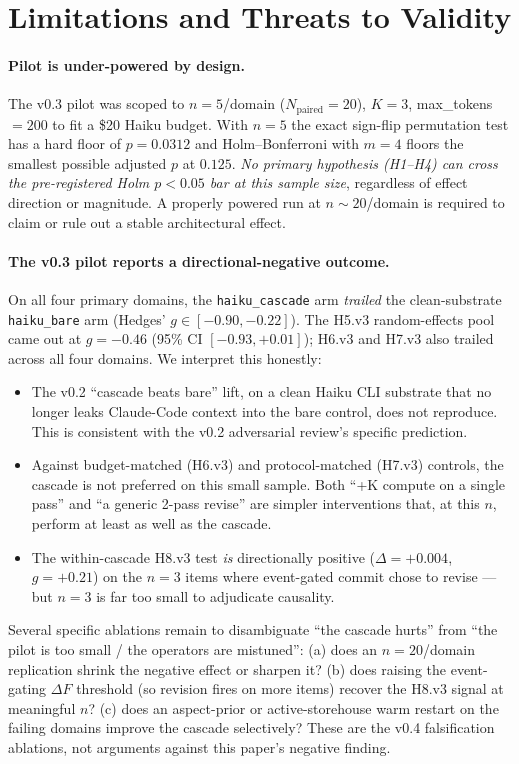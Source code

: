 \section{Limitations and Threats to Validity}\label{sec:limitations}

\paragraph{Pilot is under-powered by design.} The v0.3 pilot was scoped to $n{=}5$/domain ($N_{\text{paired}}{=}20$), $K{=}3$, max\_tokens$=200$ to fit a \$20 Haiku budget. With $n{=}5$ the exact sign-flip permutation test has a hard floor of $p{=}0.0312$ and Holm--Bonferroni with $m{=}4$ floors the smallest possible adjusted $p$ at $0.125$. \emph{No primary hypothesis (H1--H4) can cross the pre-registered Holm $p<0.05$ bar at this sample size}, regardless of effect direction or magnitude. A properly powered run at $n{\sim}20$/domain is required to claim or rule out a stable architectural effect.

\paragraph{The v0.3 pilot reports a directional-negative outcome.} On all four primary domains, the \texttt{haiku\_cascade} arm \emph{trailed} the clean-substrate \texttt{haiku\_bare} arm (Hedges' $g \in [-0.90, -0.22]$). The H5.v3 random-effects pool came out at $g=-0.46$ (95\% CI $[-0.93, +0.01]$); H6.v3 and H7.v3 also trailed across all four domains. We interpret this honestly:
\begin{itemize}
  \item The v0.2 ``cascade beats bare'' lift, on a clean Haiku CLI substrate that no longer leaks Claude-Code context into the bare control, does not reproduce. This is consistent with the v0.2 adversarial review's specific prediction.
  \item Against budget-matched (H6.v3) and protocol-matched (H7.v3) controls, the cascade is not preferred on this small sample. Both ``+K compute on a single pass'' and ``a generic 2-pass revise'' are simpler interventions that, at this $n$, perform at least as well as the cascade.
  \item The within-cascade H8.v3 test \emph{is} directionally positive ($\Delta=+0.004$, $g=+0.21$) on the $n=3$ items where event-gated commit chose to revise --- but $n=3$ is far too small to adjudicate causality.
\end{itemize}
Several specific ablations remain to disambiguate ``the cascade hurts'' from ``the pilot is too small / the operators are mistuned'': (a) does an $n{=}20$/domain replication shrink the negative effect or sharpen it? (b) does raising the event-gating $\Delta F$ threshold (so revision fires on more items) recover the H8.v3 signal at meaningful $n$? (c) does an aspect-prior or active-storehouse warm restart on the failing domains improve the cascade selectively? These are the v0.4 falsification ablations, not arguments against this paper's negative finding.

